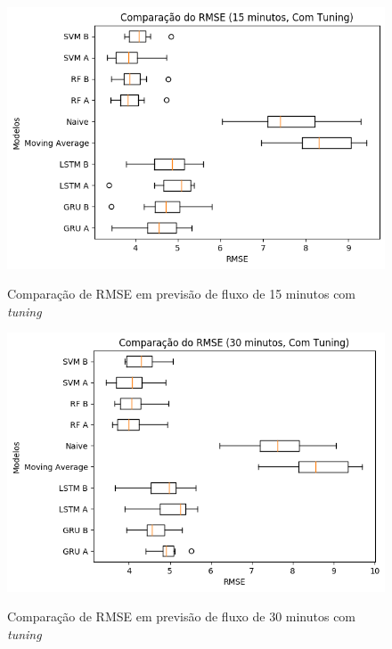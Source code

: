 \begin{figure}[htbp]
    \centering
    \includegraphics[scale=0.8]{monography/img/snapshots/comparacao_do_rmse_(15_minutos,_com_tuning)_performance_boxes.png}
    \label{figure:comparacao_previsao_rmse_15_com_tuning}
    \caption{Comparação de RMSE em previsão de fluxo de 15 minutos com \textit{tuning}}
\end{figure}

\begin{figure}[htbp]
    \centering
    \includegraphics[scale=0.8]{monography/img/snapshots/comparacao_do_rmse_(30_minutos,_com_tuning)_performance_boxes.png}
    \label{figure:comparacao_previsao_rmse_30_com_tuning}
    \caption{Comparação de RMSE em previsão de fluxo de 30 minutos com \textit{tuning}}
\end{figure}

